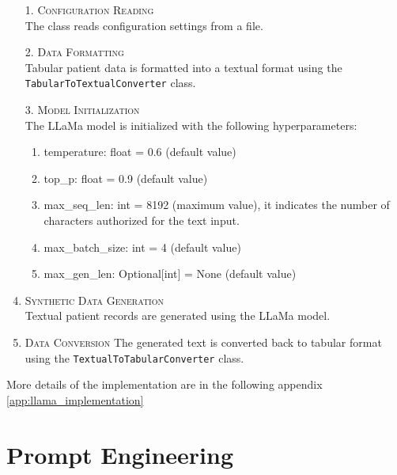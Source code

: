 \begin{enumerate}
    \item[1.] \textsc{Configuration Reading}\\ 
    The class reads configuration settings from a file.
    
    \item[2.] \textsc{Data Formatting}\\
    Tabular patient data is formatted into a textual format using the \texttt{TabularToTextualConverter} class.
    
    \item[3.] \textsc{Model Initialization}\\
    The LLaMa model is initialized with the following hyperparameters:
    \begin{enumerate}
        \item temperature: float = 0.6 (default value)
        \item top\_p: float = 0.9 (default value)
        \item max\_seq\_len: int = 8192 (maximum value), it indicates the number of characters authorized for the text input.
        \item max\_batch\_size: int = 4 (default value)
        \item max\_gen\_len: Optional[int] = None (default value)
    \end{enumerate}
    
    \item \textsc{Synthetic Data Generation}\\
    Textual patient records are generated using the LLaMa model.
        
    \item \textsc{Data Conversion} The generated text is converted back to tabular format using the \texttt{TextualToTabularConverter} class.
\end{enumerate}


More details of the implementation are in the following appendix \ref{app:llama_implementation}

\vspace{0.5cm}
\section{Prompt Engineering}






